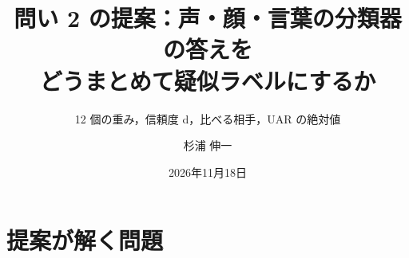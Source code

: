 \newcommand{\bubbleii}[3]{\begin{scope}[shift={(#1,#2)}]\draw[#3, line width=0.8pt, fill=white, rounded corners=2pt] (-0.75,-0.28) rectangle (0.75,0.32);
  \draw[#3, line width=0.8pt, fill=white] (-0.4,-0.28) -- (-0.55,-0.48) -- (-0.2,-0.28);
  \draw[#3, line width=0.8pt] (-0.5,0.12) -- (0.5,0.12); \draw[#3, line width=0.8pt] (-0.5,-0.08) -- (0.25,-0.08);\end{scope}}
\newcommand{\wavei}[3]{\draw[#3, line width=0.7pt, shift={(#1,#2)}] plot[domain=0:1.6, samples=140, smooth] (\x, {0.42*sin(\x*1100)*exp(-((\x-0.8)^2)/0.12)});}
\newcommand{\facei}[3]{\begin{scope}[shift={(#1,#2)}]\draw[#3, line width=0.8pt, fill=white] (0,0) circle (0.42);
  \fill[#3] (-0.15,0.1) circle (0.05); \fill[#3] (0.15,0.1) circle (0.05);
  \draw[#3, line width=0.7pt] (-0.2,-0.1) arc[start angle=200, end angle=340, radius=0.21];\end{scope}}
\newcommand{\bubblei}[3]{\begin{scope}[shift={(#1,#2)}]\draw[#3, line width=0.8pt, fill=white, rounded corners=2pt] (-0.75,-0.28) rectangle (0.75,0.32);
  \draw[#3, line width=0.8pt, fill=white] (-0.4,-0.28) -- (-0.55,-0.48) -- (-0.2,-0.28);
  \node[text=#3, font=\tiny] at (0,0.02) {``Oh, really?!''};\end{scope}}
\newcommand{\absplot}[2]{\addplot[#2, error bars/.cd, y dir=both, y explicit, error bar style={#2}] table[x=x, y=uar, y error plus=ep, y error minus=em]{#1};}
\newcommand{\abspanel}[2]{\nextgroupplot[title={#2}]
  \absplot{abs_#1_konly.csv}{mMuted, mark=square*}\absplot{abs_#1_prod.csv}{mLightBrown, mark=triangle*}
  \absplot{abs_#1_prop.csv}{mAccentBlue, mark=*}\absplot{abs_#1_stprop.csv}{mGood, mark=diamond*}}

\title{問い 2 の提案：声・顔・言葉の分類器の答えを\\どうまとめて疑似ラベルにするか}
\subtitle{12 個の重み，信頼度 d，比べる相手，UAR の絶対値}
\author{杉浦 伸一}
\date{2026年11月18日}


\maketitle

\section{提案が解く問題}


